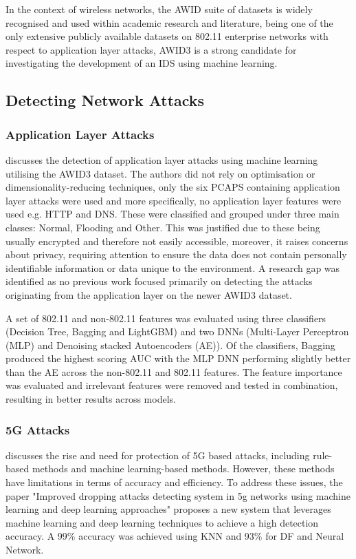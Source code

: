In the context of wireless networks, the AWID suite of datasets is widely recognised and used within academic research and literature, being one of the only extensive publicly available datasets on 802.11 enterprise networks with respect to application layer attacks, AWID3 is a strong candidate for investigating the development of an IDS using machine learning. 

\subsection{Detecting Network Attacks}

\subsubsection*{Application Layer Attacks}

\textcite{s22155633} discusses the detection of application layer attacks using machine learning utilising the AWID3 dataset. The authors did not rely on optimisation or dimensionality-reducing techniques, only the six PCAPS containing application layer attacks were used and more specifically, no application layer features were used e.g. HTTP and DNS. These were classified and grouped under three main classes: Normal, Flooding and Other. This was justified due to these being usually encrypted and therefore not easily accessible, moreover, it raises concerns about privacy, requiring attention to ensure the data does not contain personally identifiable information or data unique to the environment. A research gap was identified as no previous work focused primarily on detecting the attacks originating from the application layer on the newer AWID3 dataset.

A set of 802.11 and non-802.11 features was evaluated using three classifiers (Decision Tree, Bagging and LightGBM) and two DNNs (Multi-Layer Perceptron (MLP) and Denoising stacked Autoencoders (AE)). Of the classifiers, Bagging produced the highest scoring AUC with the MLP DNN performing slightly better than the AE across the non-802.11 and 802.11 features. The feature importance was evaluated and irrelevant features were removed and tested in combination, resulting in better results across models. 

\subsubsection*{5G Attacks}

\textcite{Mughaid2022} discusses the rise and need for protection of 5G based attacks, including rule-based methods and machine learning-based methods. However, these methods have limitations in terms of accuracy and efficiency. To address these issues, the paper "Improved dropping attacks detecting system in 5g networks using machine learning and deep learning approaches" proposes a new system that leverages machine learning and deep learning techniques to achieve a high detection accuracy. A 99\% accuracy was achieved using KNN and 93\% for DF and Neural Network.

